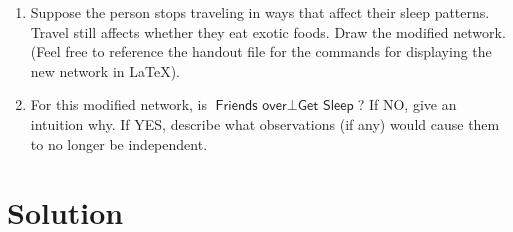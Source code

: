 \documentclass[submit]{harvardml}
\newcommand{\attr}[1]{\textsf{#1}}
\begin{document}
\begin{problem}
\begin{enumerate}
\item Suppose the person stops traveling in ways that affect their
  sleep patterns.  Travel still
  affects whether they eat exotic foods.  Draw the modified network. (Feel free to reference the handout file for the commands for displaying the new network in \LaTeX).

\item For this modified network, is $\attr{Friends over} \perp
  \attr{Get Sleep}$? If NO, give an intuition why.  If YES,
  describe what observations (if any) would cause them to no longer be
  independent.

\end{enumerate}
\end{problem}

\newpage
\section*{Solution}
\end{document}
